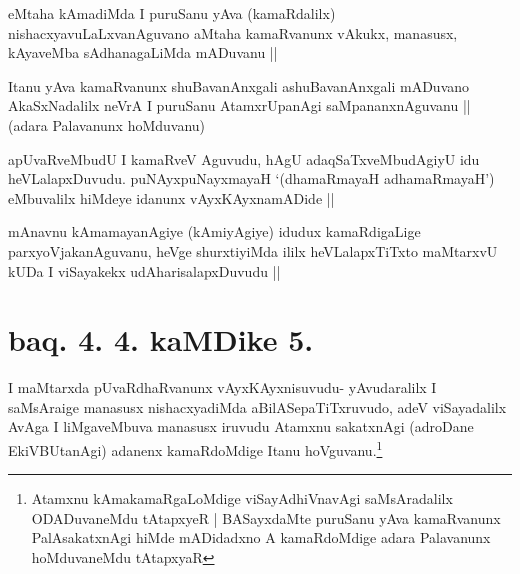 
\begin{artha}
eMtaha kAmadiMda I puruSanu yAva (kamaRdalilx)
nishacxyavuLaLxvanAguvano aMtaha kamaRvanunx vAkukx, manasusx,
kAyaveMba sAdhanagaLiMda mADuvanu ||
\end{artha}

\begin{artha}
Itanu yAva kamaRvanunx shuBavanAnxgali ashuBavanAnxgali mADuvano
AkaSxNadalilx neVrA I puruSanu AtamxrUpanAgi saMpananxnAguvanu ||
(adara Palavanunx hoMduvanu) 
\end{artha}


\begin{artha}
apUvaRveMbudU I kamaRveV Aguvudu, hAgU adaqSaTxveMbudAgiyU idu
heVLalapxDuvudu. puNAyxpuNayxmayaH `(dhamaRmayaH adhamaRmayaH')
eMbuvalilx hiMdeye idanunx vAyxKAyxnamADide ||
\end{artha}


\begin{artha}
mAnavnu kAmamayanAgiye (kAmiyAgiye) idudux kamaRdigaLige
parxyoVjakanAguvanu, heVge shurxtiyiMda ililx heVLalapxTiTxto
maMtarxvU kUDa I viSayakekx udAharisalapxDuvudu ||
\end{artha}


\section*{baq. 4. 4. kaMDike 5.}

\stext

\begin{artha}
I maMtarxda pUvaRdhaRvanunx vAyxKAyxnisuvudu- yAvudaralilx I
saMsAraige manasusx nishacxyadiMda aBilASepaTiTxruvudo, adeV
viSayadalilx AvAga I liMgaveMbuva manasusx iruvudu Atamxnu sakatxnAgi
(adroDane EkiVBUtanAgi) adanenx kamaRdoMdige Itanu
hoVguvanu.\footnote{Atamxnu kAmakamaRgaLoMdige viSayAdhiVnavAgi
  saMsAradalilx ODADuvaneMdu tAtapxyeR | BASayxdaMte puruSanu yAva
  kamaRvanunx PalAsakatxnAgi hiMde mADidadxno A kamaRdoMdige adara
  Palavanunx hoMduvaneMdu tAtapxyaR}
\end{artha}


